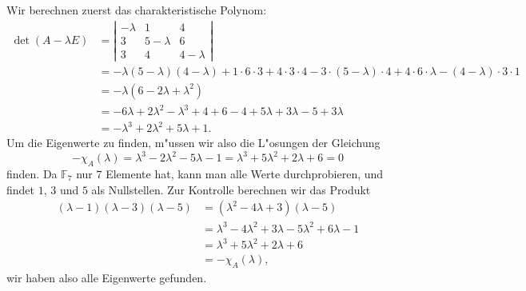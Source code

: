 Wir berechnen zuerst das charakteristische Polynom:
\begin{align*}
\det(A-\lambda E)
&
=
\left|\begin{matrix}
-\lambda&1        &4\\
3       &5-\lambda&6\\
3       &4        &4-\lambda
\end{matrix}\right|
\\
&=
-\lambda(5-\lambda)(4-\lambda)
+1\cdot6\cdot3
+4\cdot3\cdot 4
-3\cdot(5-\lambda)\cdot 4
+4\cdot6\cdot\lambda
-(4-\lambda)\cdot3\cdot 1
\\
&=
-\lambda(6-2\lambda+\lambda^2)
\\
&=
-6\lambda+2\lambda^2-\lambda^3
+4
+6
-4+5\lambda
+3\lambda
-5+3\lambda
\\
&=
-\lambda^3+2\lambda^2+5\lambda+1.
\end{align*}
Um die Eigenwerte zu finden, m"ussen wir also die L"osungen der
Gleichung
\[
-\chi_A(\lambda)
=
\lambda^3
-2\lambda^2
-5\lambda
-1
=
\lambda^3
+5\lambda^2
+2\lambda
+6
=
0
\]
finden.
Da $\mathbb F_7$ nur $7$ Elemente hat, kann man alle Werte durchprobieren,
und findet $1$, $3$ und $5$ als Nullstellen.
Zur Kontrolle berechnen wir das Produkt
\begin{align*}
(\lambda -1)(\lambda-3)(\lambda-5)
&
=
(\lambda^2-4\lambda+3)(\lambda-5)
\\
&=
\lambda^3-4\lambda^2+3\lambda
-5\lambda^2+6\lambda-1
\\
&=
\lambda^3+5\lambda^2+2\lambda+6
\\
&=
-\chi_A(\lambda),
\end{align*}
wir haben also alle Eigenwerte gefunden.

